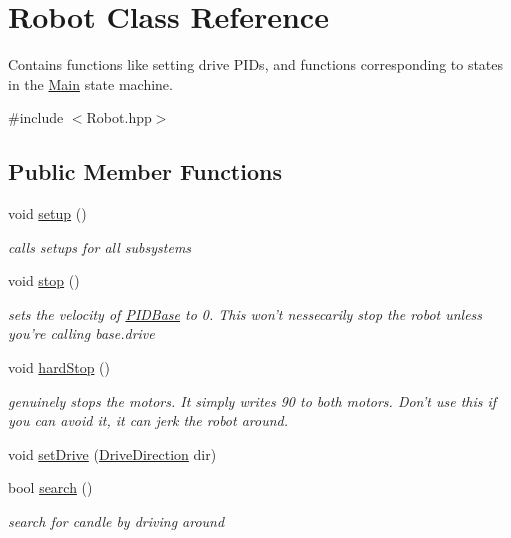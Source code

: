 \hypertarget{classRobot}{\section{Robot Class Reference}
\label{classRobot}
}


Contains functions like setting drive P\-I\-Ds, and functions corresponding to states in the \hyperlink{classMain}{Main} state machine.  




{\ttfamily \#include $<$Robot.\-hpp$>$}

\subsection*{Public Member Functions}
\begin{DoxyCompactItemize}
\item 
void \hyperlink{classRobot_a1fc37e3c329d59795f6adf44199d4df9}{setup} ()
\begin{DoxyCompactList}\small\item\em calls setups for all subsystems \end{DoxyCompactList}\item 
void \hyperlink{classRobot_a14dfe126ae973d3b9f81fee81a06ac22}{stop} ()
\begin{DoxyCompactList}\small\item\em sets the velocity of \hyperlink{classPIDBase}{P\-I\-D\-Base} to 0. This won't nessecarily stop the robot unless you're calling base.\-drive \end{DoxyCompactList}\item 
void \hyperlink{classRobot_a5d21e8314db61586ed66637baac6063a}{hard\-Stop} ()
\begin{DoxyCompactList}\small\item\em genuinely stops the motors. It simply writes 90 to both motors. Don't use this if you can avoid it, it can jerk the robot around. \end{DoxyCompactList}\item 
void \hyperlink{classRobot_ade0935cead03791f27fa854df88a3f22}{set\-Drive} (\hyperlink{DriveMotor_8hpp_a077d9d13989efa3142086ea83cbb1e68}{Drive\-Direction} dir)
\item 
bool \hyperlink{classRobot_a1f08dec6eea6b51d73cd41a8db3bb893}{search} ()
\begin{DoxyCompactList}\small\item\em search for candle by driving around \end{DoxyCompactList}\item 

\end{DoxyCompactItemize}
